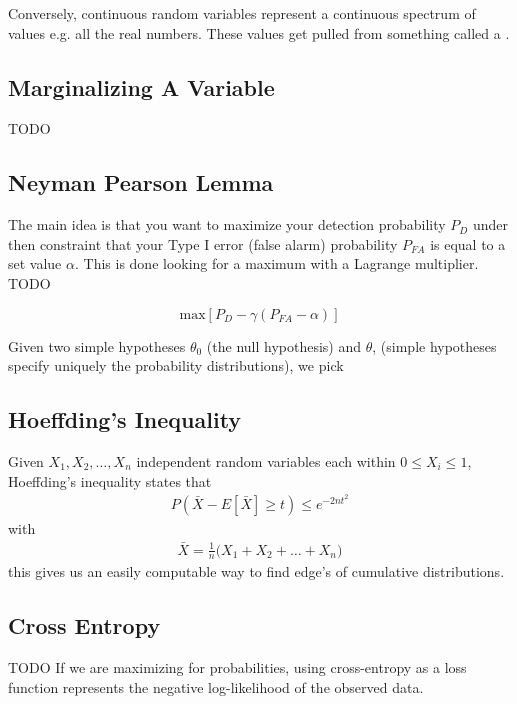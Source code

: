 Conversely, continuous random variables represent a continuous spectrum of values e.g. all the real numbers. These values get pulled from something called a .

\subsection{Marginalizing A Variable}
TODO

\subsection{Neyman Pearson Lemma}
The main idea is that you want to maximize your detection probability $P_D$ under then constraint that your Type I error (false alarm) probability $P_{FA}$ is equal to a set value $\alpha$. This is done looking for a maximum with a Lagrange multiplier. TODO

\begin{equation}
	\textrm{max}[P_D - \gamma(P_{FA}-\alpha)]
\end{equation}

Given two simple hypotheses $\theta_0$ (the null hypothesis) and $\theta$, (simple hypotheses specify uniquely the probability distributions), we pick 

\subsection{Hoeffding's Inequality}\label{hoeffding}
Given $X_1, X_2, \ldots, X_n$ independent random variables each within $0 \leq X_i \leq 1$, Hoeffding's inequality states that 
\begin{align}
	P(\bar{X} - E[\bar{X}] \geq t) \leq e^{-2nt^2}
\end{align}
with 
\begin{align}
	\bar{X} = \frac{1}{n}\Big(X_1+X_2+\ldots+X_n\Big)
\end{align}
this gives us an easily computable way to find edge's of cumulative distributions.
 
\subsection{Cross Entropy}
TODO
If we are maximizing for probabilities, using cross-entropy as a loss function represents the negative log-likelihood of the observed data\cite{grus}.

